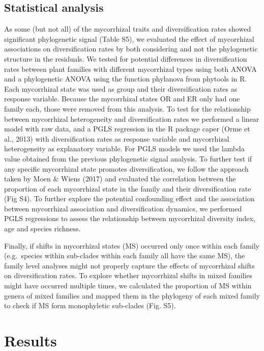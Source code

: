 \documentclass[12pt,]{article}
\begin{document}
\hypertarget{statistical-analysis}{%
\subsection{Statistical analysis}\label{statistical-analysis}}

As some (but not all) of the mycorrhizal traits and diversification
rates showed significant phylogenetic signal (Table S5), we evaluated
the effect of mycorrhizal associations on diversification rates by both
considering and not the phylogenetic structure in the residuals. We
tested for potential differences in diversification rates between plant
families with different mycorrhizal types using both ANOVA and a
phylogenetic ANOVA using the function phylanova from phytools in R. Each
mycorrhizal state was used as group and their diversification rates as
response variable. Because the mycorrhizal states OR and ER only had one
family each, those were removed from this analysis. To test for the
relationship between mycorrhizal heterogeneity and diversification rates
we performed a linear model with raw data, and a PGLS regression in the
R package caper (Orme et al., 2013) with diversification rates as
response variable and mycorrhizal heterogeneity as explanatory variable.
For PGLS models we used the lambda value obtained from the previous
phylogenetic signal analysis. To further test if any specific
mycorrhizal state promotes diversification, we follow the approach taken
by Moen \& Wiens (2017) and evaluated the correlation between the
proportion of each mycorrhizal state in the family and their
diversification rate (Fig S4). To further explore the potential
confounding effect and the association between mycorrhizal association
and diversification dynamics, we performed PGLS regressions to assess
the relationship between mycorrhizal diversity index, age and species
richness.

Finally, if shifts in mycorrhizal states (MS) occurred only once within
each family (e.g.~species within sub-clades within each family all have
the same MS), the family level analyses might not properly capture the
effects of mycorrhizal shifts on diversification rates. To explore
whether mycorrhizal shifts in mixed families might have occurred
multiple times, we calculated the proportion of MS within genera of
mixed families and mapped them in the phylogeny of each mixed family to
check if MS form monophyletic sub-clades (Fig. S5).

\hypertarget{results}{%
\section{Results}\label{results}}
\end{document}
